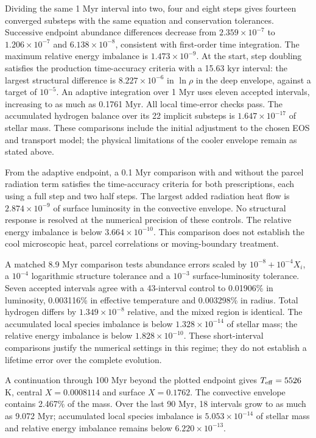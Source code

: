 \documentclass[11pt,letterpaper]{article}
\begin{document}
Dividing the same 1 Myr interval into two, four and eight steps gives fourteen
converged substeps with the same equation and conservation tolerances.
Successive endpoint abundance differences decrease from
$2.359\times10^{-7}$ to $1.206\times10^{-7}$ and $6.138\times10^{-8}$,
consistent with first-order time integration. The maximum relative energy
imbalance is $1.473\times10^{-9}$. At the start, step doubling satisfies
the production time-accuracy criteria with a 15.63 kyr interval: the largest
structural difference is $8.227\times10^{-6}$ in $\ln\rho$ in the deep envelope,
against a target of $10^{-5}$. An adaptive integration over 1 Myr uses eleven
accepted intervals, increasing to as much as 0.1761 Myr. All local time-error
checks pass. The accumulated hydrogen balance over its 22 implicit substeps
is $1.647\times10^{-17}$ of stellar mass. These comparisons include the
initial adjustment to the chosen EOS and transport model; the physical
limitations of the cooler envelope remain as stated above.

From the adaptive endpoint, a 0.1 Myr comparison with and without the
parcel radiation term satisfies the time-accuracy criteria for both
prescriptions, each using a full step and two half steps. The largest added
radiation heat flow is $2.874\times10^{-9}$ of surface luminosity in the
convective envelope. No structural response is resolved at the numerical
precision of these controls. The relative energy imbalance is below
$3.664\times10^{-10}$. This comparison does not establish the cool microscopic
heat, parcel correlations or moving-boundary treatment.

A matched 8.9 Myr comparison tests abundance errors scaled by
$10^{-8}+10^{-4}X_i$, a $10^{-4}$ logarithmic structure tolerance and a
$10^{-3}$ surface-luminosity tolerance. Seven accepted intervals agree with
a 43-interval control to 0.01906\% in luminosity, 0.003116\% in effective
temperature and 0.003298\% in radius. Total hydrogen differs by
$1.349\times10^{-8}$ relative, and the mixed region is identical.
The accumulated local species imbalance is below
$1.328\times10^{-14}$ of stellar mass; the relative energy imbalance is
below $1.828\times10^{-10}$. These short-interval comparisons justify the
numerical settings in this regime; they do not establish a lifetime error
over the complete evolution.

A continuation through 100 Myr beyond the plotted endpoint gives
$T_{\rm eff}=5526$ K, central $X=0.0008114$ and surface $X=0.1762$.
The convective envelope contains 2.467\% of the mass. Over the last 90 Myr,
18 intervals grow to as much as 9.072 Myr; accumulated local species
imbalance is $5.053\times10^{-14}$ of stellar mass and relative energy
imbalance remains below $6.220\times10^{-13}$.
\end{document}
